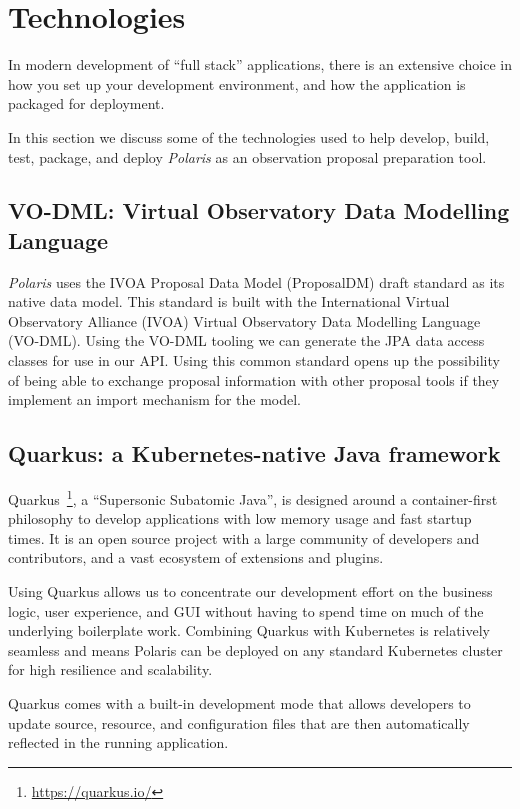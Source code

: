 \documentclass[11pt,twoside]{article}
\begin{document}
\section{Technologies}\label{sec:technologies}

In modern development of ``full stack'' applications, there is an extensive choice in how you set up your
development environment, and how the application is packaged for deployment.

In this section we discuss some of the technologies used to help develop, build, test, package, and deploy
\emph{Polaris} as an observation proposal preparation tool.

\subsection{VO-DML: Virtual Observatory Data Modelling Language}\label{subsec:vodml}

\emph{Polaris} uses the IVOA Proposal Data Model (ProposalDM) draft standard as its native data model.
This standard is built with the International Virtual Observatory Alliance (IVOA) Virtual
Observatory Data Modelling Language (VO-DML).
Using the VO-DML tooling we can generate the JPA data access classes for use in our API\@.
Using this common standard opens up the possibility of being able to exchange proposal information with
other proposal tools if they implement an import mechanism for the model.


\subsection{Quarkus: a Kubernetes-native Java framework}\label{subsec:quarkus}

Quarkus~\footnote{\url{https://quarkus.io/}}, a ``Supersonic Subatomic Java'', is designed around a
container-first philosophy to develop applications with low memory usage and fast startup times.
It is an open source project with a large community of developers and contributors, and a vast ecosystem
of extensions and plugins.

Using Quarkus allows us to concentrate our development effort on the business logic, user experience, and GUI
without having to spend time on much of the underlying boilerplate work.
Combining Quarkus with Kubernetes is relatively seamless and means Polaris can be deployed on any standard
Kubernetes cluster for high resilience and scalability.

Quarkus comes with a built-in development mode that allows developers to update source, resource, and
configuration files that are then automatically reflected in the running application.
\end{document}
